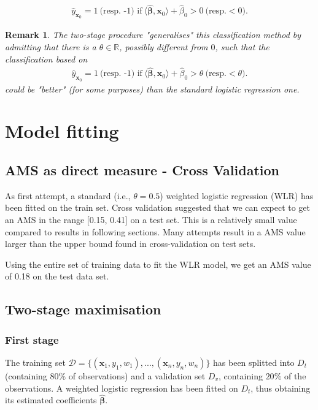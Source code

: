 \documentclass[]{article}
\newcommand{\x}{\mathbf{x}}
\newcommand{\bbeta}{\boldsymbol \beta}
\newtheorem{remark}[theorem]{Remark}
\begin{document}
\begin{align*}
\hat{y}_{\x_0}=1 \ \text{(resp. -1) if}\ \langle\hat{\bbeta},\x_0\rangle+\hat{\beta}_0>0 \  \text{(resp.} <0).
\end{align*}

\begin{remark}
The two-stage procedure "generalises" this classification method by admitting that there is a $\theta\in \mathbb{R}$, possibly different from $0$, such that the classification based on 
\begin{align*}
\hat{y}_{\x_0}=1 \ \text{(resp. -1) if}\ \langle\hat{\bbeta},\x_0\rangle+\hat{\beta}_0>\theta \  \text{(resp.} <\theta).
\end{align*}
could be "better" (for some purposes) than the standard logistic regression one. 
\end{remark}


\section{Model fitting}

\subsection{AMS as direct measure - Cross Validation}

As first attempt, a standard (i.e., $\theta=0.5$) weighted logistic regression (WLR) has been fitted on the train set. Cross validation suggested that we can expect to get an AMS in the range [0.15, 0.41] on a test set. This is a relatively small value compared to results in following sections. Many attempts result in a AMS value larger than the upper bound found in cross-validation on test sets.

Using the entire set of training data to fit the WLR model, we get an AMS value of 0.18 on the test data set.

\subsection{Two-stage maximisation}

\subsubsection{First stage}
The training set $\mathcal{D} = \{(\bm{x}_1, y_1,w_1),...,(\bm{x}_n,y_n,w_n)\}$ has been splitted into $D_t$ (containing $80\%$ of observations) and a validation set $D_v$, containing $20\%$ of the observations. A weighted logistic regression has been fitted on $D_t$, thus obtaining its estimated coefficients $\hat{\bbeta}$.
\end{document}
